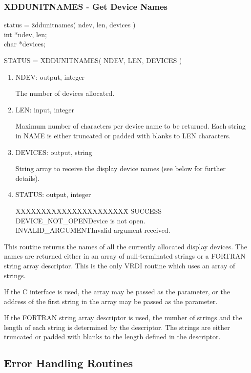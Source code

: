 \subsubsection{XDDUNITNAMES - Get Device Names}
\begin{tabbing}
status = \=zddunitnames( ndev, len, devices )\\
\>int  *ndev, len;\\
\>char  *devices;\\
\end{tabbing}
STATUS = XDDUNITNAMES( NDEV, LEN, DEVICES )
\begin{enumerate}
\item NDEV:  output, integer

The number of devices allocated.
\item LEN:  input, integer

Maximum number of characters per device name to be returned.  Each
string in NAME is either truncated or padded with blanks to LEN
characters.
\item DEVICES:  output, string

String array to receive the display device names (see below for
further details).
\item STATUS:  output, integer
\begin{tabbing}
XXXXXXXXXXXXXXXXXXXXXX\=\kill
SUCCESS\\
DEVICE\_NOT\_OPEN\>Device is not open.\\
INVALID\_ARGUMENT\>Invalid argument received.\\
\end{tabbing}
\end{enumerate}
This routine returns the names of all the currently allocated display
devices.  The names are returned either in an array of null-terminated
strings or a FORTRAN string array descriptor.  This is the only VRDI
routine which uses an array of strings.

If the C interface is used, the array may be passed as the parameter,
or the address of the first string in the array may be passed as the
parameter.

If the FORTRAN string array descriptor is used, the number of strings
and the length of each string is determined by the descriptor.  The
strings are either truncated or padded with blanks to the length
defined in the descriptor.
\newpage
\subsection{Error Handling Routines}
